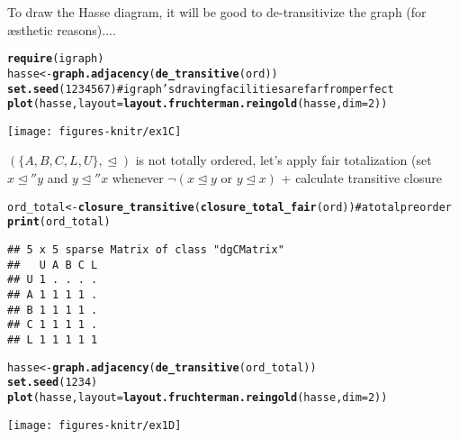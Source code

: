 \documentclass[11pt]{article}\usepackage{graphicx, color}
\makeatletter
\newcommand{\hlfunctioncall}[1]{\textcolor[rgb]{0.501960784313725,0,0.329411764705882}{\textbf{#1}}}%
\newcommand{\hlcomment}[1]{\textcolor[rgb]{0.180392156862745,0.6,0.341176470588235}{#1}}%
\newenvironment{kframe}{%
 \def\at@end@of@kframe{}%
 \ifinner\ifhmode%
  \def\at@end@of@kframe{\end{minipage}}%
  \begin{minipage}{\columnwidth}%
 \fi\fi%
 \def\FrameCommand##1{\hskip\@totalleftmargin \hskip-\fboxsep
 \colorbox{shadecolor}{##1}\hskip-\fboxsep
     \hskip-\linewidth \hskip-\@totalleftmargin \hskip\columnwidth}%
 \MakeFramed {\advance\hsize-\width
   \@totalleftmargin\z@ \linewidth\hsize
   \@setminipage}}%
 {\par\unskip\endMakeFramed%
 \at@end@of@kframe}
\newenvironment{knitrout}{}{} %
\theoremstyle{remark}
\theoremstyle{definition}
\makeatother
\begin{document}
To draw the Hasse diagram, it will be good to de-transitivize
the graph (for \ae{}sthetic reasons)....

\begin{knitrout}\small
{}\color{fgcolor}\begin{kframe}
\begin{alltt}
\hlfunctioncall{require}(igraph)
hasse <- \hlfunctioncall{graph.adjacency}(\hlfunctioncall{de_transitive}(ord))
\hlfunctioncall{set.seed}(1234567) \hlcomment{# igraph's draving facilities are far from perfect}
\hlfunctioncall{plot}(hasse, layout=\hlfunctioncall{layout.fruchterman.reingold}(hasse, dim=2)) 
\end{alltt}
\end{kframe}

{\centering \texttt{[image: figures-knitr/ex1C]} 

}



\end{knitrout}


$(\{A, B, C, L, U\}, \trianglelefteq)$ is not totally ordered,
let's apply fair totalization (set $x\trianglelefteq'' y$
and $y\trianglelefteq'' x$ whenever $\neg (x\trianglelefteq y\text{ or }
y\trianglelefteq x)$ + calculate transitive closure


\begin{knitrout}\small
{}\color{fgcolor}\begin{kframe}
\begin{alltt}
ord_total <- \hlfunctioncall{closure_transitive}(\hlfunctioncall{closure_total_fair}(ord)) \hlcomment{# a total preorder}
\hlfunctioncall{print}(ord_total)
\end{alltt}
\begin{verbatim}
## 5 x 5 sparse Matrix of class "dgCMatrix"
##   U A B C L
## U 1 . . . .
## A 1 1 1 1 .
## B 1 1 1 1 .
## C 1 1 1 1 .
## L 1 1 1 1 1
\end{verbatim}
\begin{alltt}
hasse <- \hlfunctioncall{graph.adjacency}(\hlfunctioncall{de_transitive}(ord_total))
\hlfunctioncall{set.seed}(1234)
\hlfunctioncall{plot}(hasse, layout=\hlfunctioncall{layout.fruchterman.reingold}(hasse, dim=2))
\end{alltt}
\end{kframe}

{\centering \texttt{[image: figures-knitr/ex1D]} 

}



\end{knitrout}
\end{document}
